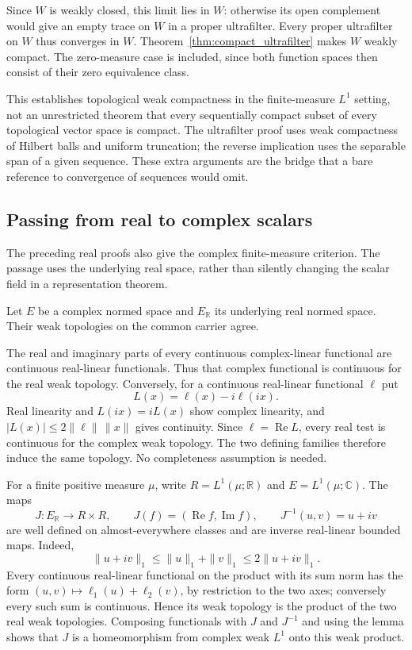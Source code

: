 Since $W$ is weakly closed, this limit lies in $W$: otherwise its open
complement would give an empty trace on $W$ in a proper ultrafilter.
Every proper ultrafilter on $W$ thus converges in $W$.
Theorem~\ref{thm:compact_ultrafilter} makes $W$ weakly compact.
The zero-measure case is included, since both function spaces then
consist of their zero equivalence class.
\Done

This establishes topological weak compactness in the finite-measure
$L^1$ setting, not an unrestricted theorem that every sequentially
compact subset of every topological vector space is compact. The
ultrafilter proof uses weak compactness of Hilbert balls and uniform
truncation; the reverse implication uses the separable span of a given
sequence. These extra arguments are the bridge that a bare reference
to convergence of sequences would omit.

\subsection{Passing from real to complex scalars}
The preceding real proofs also give the complex finite-measure criterion.
The passage uses the underlying real space, rather than silently changing
the scalar field in a representation theorem.

\begin{lemma}
\label{lem:realification_weak}
Let $E$ be a complex normed space and $E_{\mathbb R}$ its underlying
real normed space. Their weak topologies on the common carrier agree.
\end{lemma}
\Proof
The real and imaginary parts of every continuous complex-linear
functional are continuous real-linear functionals. Thus that complex
functional is continuous for the real weak topology. Conversely, for a
continuous real-linear functional $\ell$ put
\[
L(x)=\ell(x)-i\ell(ix).
\]
Real linearity and $L(ix)=iL(x)$ show complex linearity, and
$|L(x)|\leq2\|\ell\|\,\|x\|$ gives continuity. Since
$\ell=\operatorname{Re}L$, every real test is continuous for the complex
weak topology. The two defining families therefore induce the same
topology. No completeness assumption is needed.
\Done

For a finite positive measure $\mu$, write $R=L^1(\mu;\mathbb R)$
and $E=L^1(\mu;\mathbb C)$. The maps
\[
J:E_{\mathbb R}\longrightarrow R\times R,\qquad
J(f)=(\operatorname{Re}f,\operatorname{Im}f),\qquad
J^{-1}(u,v)=u+iv
\]
are well defined on almost-everywhere classes and are inverse real-linear
bounded maps. Indeed,
\[
\|u+iv\|_1\leq\|u\|_1+\|v\|_1\leq2\|u+iv\|_1.
\]
Every continuous real-linear functional on the product with its sum norm
has the form $(u,v)\mapsto\ell_1(u)+\ell_2(v)$, by restriction to the
two axes; conversely every such sum is continuous. Hence its weak topology
is the product of the two real weak topologies. Composing functionals
with $J$ and $J^{-1}$ and using the lemma shows that $J$ is a
homeomorphism from complex weak $L^1$ onto this weak product.

